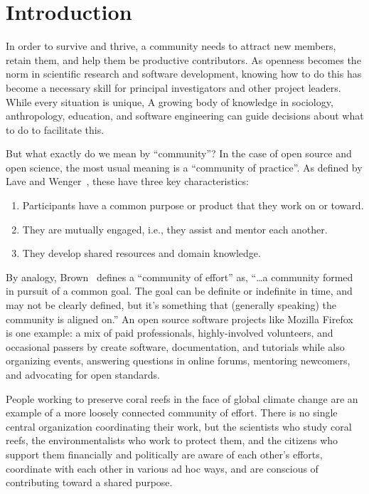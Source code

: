 \documentclass[10pt,letterpaper]{article}
\begin{document}
\section*{Introduction}

In order to survive and thrive,
a community needs to attract new members,
retain them,
and help them be productive contributors.
As openness becomes the norm in scientific research and software development,
knowing how to do this has become a necessary skill for principal investigators and other project leaders.
While every situation is unique,
A growing body of knowledge in sociology, anthropology, education, and software engineering
can guide decisions about what to do to facilitate this.

But what exactly do we mean by ``community''?
In the case of open source and open science,
the most usual meaning is a ``community of practice''.
As defined by Lave and Wenger~\cite{lave1991,wenger1999},
these have three key characteristics:

\begin{enumerate}

\item Participants have a common purpose or product that they work on or toward.

\item They are mutually engaged, i.e., they assist and mentor each another.

\item They develop shared resources and domain knowledge.

\end{enumerate}

By analogy,
Brown~\cite{brown2019} defines a ``community of effort'' as,
``{\ldots}a community formed in pursuit of a common goal.
The goal can be definite or indefinite in time,
and may not be clearly defined,
but it's something that (generally speaking) the community is aligned on.''
An open source software projects like Mozilla Firefox~\cite{mozilla} is one example:
a mix of paid professionals,
highly-involved volunteers,
and occasional passers by create software,
documentation,
and tutorials
while also organizing events,
answering questions in online forums,
mentoring newcomers,
and advocating for open standards.

People working to preserve coral reefs in the face of global climate change are an example of
a more loosely connected community of effort.
There is no single central organization coordinating their work,
but the scientists who study coral reefs,
the environmentalists who work to protect them,
and the citizens who support them financially and politically
are aware of each other's efforts,
coordinate with each other in various ad hoc ways,
and are conscious of contributing toward a shared purpose.
\end{document}

